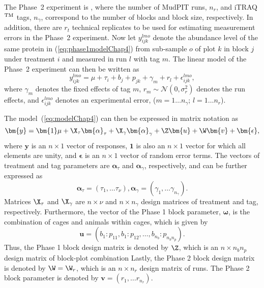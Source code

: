 The Phase~2 experiment is , where the number of MudPIT runs, $n_r$, and iTRAQ$^{\rm TM}$ tags, $n_\gamma$, correspond to the number of blocks and block size, respectively. In addition, there are $r_t$ technical replicates to be used for estimating measurement errors in the Phase~2 experiment. Now let $y_{ijk}^{lmo}$ denote the abundance level of the same protein in (\ref{eq:phase1modelChap4}) from sub-sample $o$ of plot $k$ in block $j$ under treatment $i$ and measured in run $l$ with tag $m$. The linear model of the Phase~2 experiment can then be written as
\begin{equation}\label{eq:modelChap4}
y_{ijk}^{lmo} = \mu+ \tau_i+ b_{j} + p_{jk} + \gamma_m + r_l + \epsilon_{ijk}^{lmo},
\end{equation}
where $\gamma_m$ denotes the fixed effects of tag $m$, $r_m \sim \mathcal{N}(0, \sigma_r^2)$ denotes the run effects, and $ \epsilon_{ijk}^{lmo}$ denotes an experimental error, ($m = 1 \dots n_\gamma$; $l = 1 \dots n_r$). 

The model~(\ref{eq:modelChap4}) can then be expressed in matrix notation as
\begin{equation}\label{eq:matrixModelChap4}
\bm{y} = \bm{1}\mu+ \X_{\tau}\bm{\alpha}_\tau + \X_{\gamma}\bm{\alpha}_\gamma + \Z\bm{u} + \W\bm{v} + \bm{\epsilon},
\end{equation}
where $\bm{y}$ is an $n \times 1$ vector of responses, $\bm{1}$ is also an $n \times 1$ vector for which all elements are unity, and $\bm{\epsilon}$ is an $n \times 1$ vector of random error terms. The vectors of treatment and tag parameters are $\bm{\alpha}_\tau$ and $\bm{\alpha}_\gamma$, respectively, and can be further expressed as 
\[ 
\bm{\alpha}_\tau = (\tau_1, \dots \tau_{\nu}), \bm{\alpha}_\gamma = (\gamma_1, \dots \gamma_{n_\gamma}). 
\]
Matrices $\X_{\tau}$ and $\X_{\gamma}$ are $n \times \nu$ and $n \times n_\gamma$ design matrices of treatment and tag, respectively. Furthermore, the vector of the Phase 1 block parameter, $\bm{\omega}$, is the combination of cages and animals within cages, which is given by
 \[ 
\bm{u} = (b_1: p_{11}, b_1: p_{12}, \dots, b_{n_b}: p_{n_b n_{p}}).
\]
Thus, the Phase 1 block design matrix is denoted by $\Z$, which is an $n \times n_b n_p$ design matrix of block-plot combination Lastly, the Phase 2 block design matrix is denoted by $\W =\W_{r}$, which is an $n \times n_r$ design matrix of runs. The Phase 2 block parameter is denoted by $\bm{v} = (r_{1}, \dots r_{n_r})$. 

